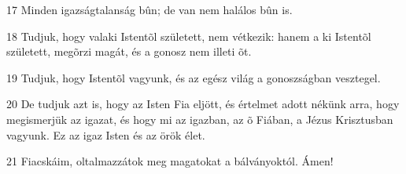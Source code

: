 \par 17 Minden igazságtalanság bûn; de van nem halálos bûn is.
\par 18 Tudjuk, hogy valaki Istentõl született, nem vétkezik: hanem a ki Istentõl született, megõrzi magát, és a gonosz nem illeti õt.
\par 19 Tudjuk, hogy Istentõl vagyunk, és az egész világ a gonoszságban vesztegel.
\par 20 De tudjuk azt is, hogy az Isten Fia eljött, és értelmet adott nékünk arra, hogy megismerjük az igazat, és hogy mi az igazban, az õ Fiában, a Jézus Krisztusban vagyunk. Ez az igaz Isten és  az örök élet.
\par 21 Fiacskáim, oltalmazzátok meg magatokat a bálványoktól. Ámen!


